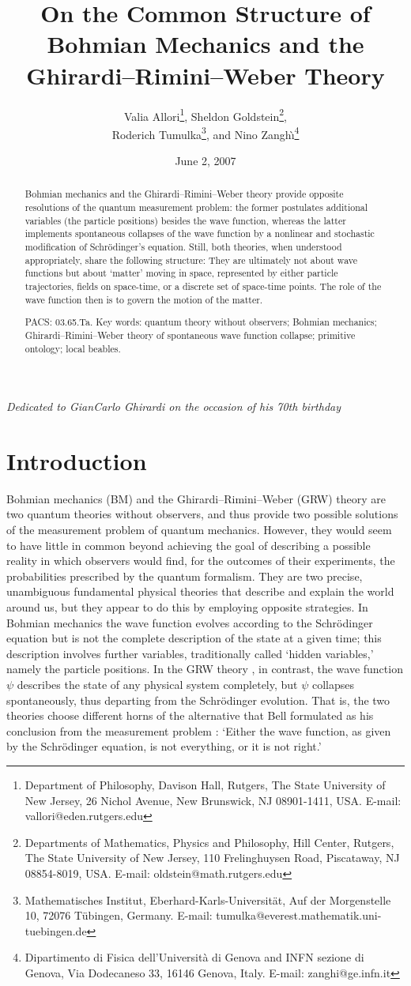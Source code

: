\documentclass[12pt]{article}
\title{\Large On the Common Structure of Bohmian Mechanics and the
       Ghirardi--Rimini--Weber Theory}
\author{
Valia Allori\footnote{Department of Philosophy, Davison Hall,
     Rutgers, The State University of New Jersey, 26 Nichol Avenue,
     New Brunswick, NJ 08901-1411, USA.
     E-mail: vallori@eden.rutgers.edu},
Sheldon Goldstein\footnote{Departments of Mathematics, Physics and
     Philosophy, Hill Center, Rutgers, The State University of New  
     Jersey, 110 Frelinghuysen Road, Piscataway, NJ 08854-8019, USA.
     E-mail: oldstein@math.rutgers.edu},\\
Roderich Tumulka\footnote{Mathematisches Institut,
     Eberhard-Karls-Universit\"at, Auf der Morgenstelle 10, 72076
     T\"ubingen, Germany. E-mail:
     tumulka@everest.mathematik.uni-tuebingen.de},
 and Nino Zangh\`\i\footnote{Dipartimento di Fisica dell'Universit\`a
     di Genova and INFN sezione di Genova, Via Dodecaneso 33, 16146
     Genova, Italy. E-mail: zanghi@ge.infn.it}
}
\date{June 2, 2007}
\begin{document}
\maketitle
\begin{abstract}
Bohmian mechanics and the Ghirardi--Rimini--Weber theory provide opposite resolutions of the quantum measurement problem:  the former postulates additional variables (the particle positions) besides the wave function, whereas the latter implements spontaneous collapses of the wave function by a nonlinear and stochastic modification of Schr\"odinger's equation. Still, both theories, when understood appropriately, share the following structure: They are ultimately not about wave functions but about `matter' moving in space, represented by either particle trajectories, fields on space-time, or a discrete set of space-time points. The role of the wave function then is to govern the motion of the matter.
\medskip


\noindent 
 PACS: 03.65.Ta. 
 Key words: quantum theory without observers; Bohmian mechanics;
 Ghirardi--Rimini--Weber theory of spontaneous wave function collapse;
 primitive ontology; local beables.
\end{abstract}


\begin{center}
\textit{Dedicated to GianCarlo Ghirardi on the occasion of his 70th birthday}  
\end{center}
\tableofcontents

\section{Introduction}


Bohmian mechanics ({\sf BM}) and the Ghirardi--Rimini--Weber ({\sf GRW})
theory are two quantum theories without observers, and thus provide two
possible solutions of the measurement problem of quantum
mechanics. However, they would seem to have little in common beyond
achieving the goal of describing a possible reality in which observers
would find, for the outcomes of their experiments, the probabilities
prescribed by the quantum formalism. They are two precise, unambiguous
fundamental physical theories that describe and explain the world around
us, but they appear to do this by employing opposite strategies. In Bohmian
mechanics \citep{Bohm52, Bell66, DGZ92, survey} the wave function evolves
according to the Schr\"odinger equation but is not the complete description
of the state at a given time; this description involves further variables,
traditionally called `hidden variables,' namely the particle
positions. In the {\sf GRW} theory \citep{Pe76, GRW86, Bell87, BG03}, in
contrast, the wave function $\psi$ describes the state of any physical
system completely, but $\psi$ collapses spontaneously, thus departing from
the Schr\"odinger evolution.  That is, the two theories choose different
horns of the alternative that Bell formulated as his conclusion from the
measurement problem \citep{Bell87}: `Either the wave function, as given by
the Schr\"odinger equation, is not everything, or it is not right.'
\end{document}
